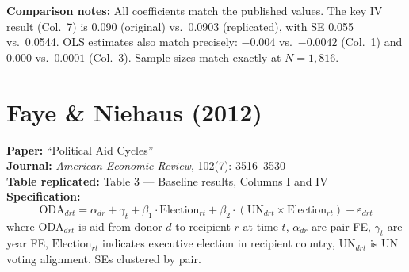 \documentclass[11pt,a4paper]{article}
\begin{document}
\vspace{1cm}
\textbf{Comparison notes:} All coefficients match the published values. The key IV result (Col.\ 7) is 0.090 (original) vs.\ 0.0903 (replicated), with SE 0.055 vs.\ 0.0544. OLS estimates also match precisely: $-0.004$ vs.\ $-0.0042$ (Col.\ 1) and $0.000$ vs.\ $0.0001$ (Col.\ 3). Sample sizes match exactly at $N = 1{,}816$.

\newpage

\section{Faye \& Niehaus (2012)}

\textbf{Paper:} ``Political Aid Cycles''\\
\textbf{Journal:} \textit{American Economic Review}, 102(7): 3516--3530\\
\textbf{Table replicated:} Table 3 --- Baseline results, Columns I and IV\\
\textbf{Specification:}
\[
\text{ODA}_{drt} = \alpha_{dr} + \gamma_t + \beta_1 \cdot \text{Election}_{rt} + \beta_2 \cdot (\text{UN}_{drt} \times \text{Election}_{rt}) + \varepsilon_{drt}
\]
where $\text{ODA}_{drt}$ is aid from donor $d$ to recipient $r$ at time $t$, $\alpha_{dr}$ are pair FE, $\gamma_t$ are year FE, $\text{Election}_{rt}$ indicates executive election in recipient country, $\text{UN}_{drt}$ is UN voting alignment. SEs clustered by pair.

\vspace{0.3cm}
\noindent{}
\end{document}
